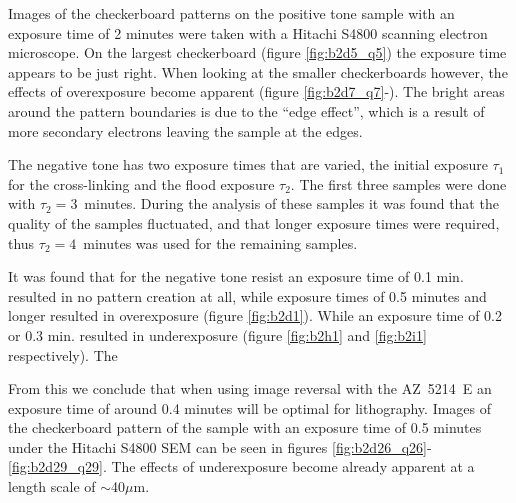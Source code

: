Images of the checkerboard patterns on the positive tone sample with an exposure time of 2 minutes were taken with a Hitachi S4800 scanning electron microscope. On the largest checkerboard (figure \ref{fig:b2d5_q5}) the exposure time appears to be just right. When looking at the smaller checkerboards however, the effects of overexposure become apparent (figure \ref{fig:b2d7_q7}-). The bright areas around the pattern boundaries is due to the ``edge effect'', which is a result of more secondary electrons leaving the sample at the edges.

The negative tone has two exposure times that are varied, the initial exposure $\tau_1$ for the cross-linking and the flood exposure $\tau_2$. The first three samples were done with $\tau_2 = 3$~minutes. During the analysis of these samples it was found that the quality of the samples fluctuated, and that longer exposure times were required, thus $\tau_2 = 4$~minutes was used for the remaining samples.

It was found that for the negative tone resist an exposure time of 0.1 min. resulted in no pattern creation at all, while exposure times of 0.5 minutes and longer resulted in overexposure (figure \ref{fig:b2d1}). While an exposure time of 0.2 or 0.3 min. resulted in underexposure (figure \ref{fig:b2h1} and \ref{fig:b2i1} respectively). The 


From this we conclude that when using image reversal with the AZ~5214~E an exposure time of around 0.4 minutes will be optimal for lithography. Images of the checkerboard pattern of the sample with an exposure time of 0.5 minutes under the Hitachi S4800 SEM can be seen in figures \ref{fig:b2d26_q26}-\ref{fig:b2d29_q29}. The effects of underexposure become already apparent at a length scale of $\sim$40$\mu$m. 


